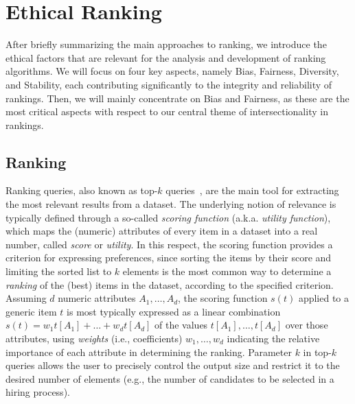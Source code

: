 \section{Ethical Ranking}
\label{ch:ethical_ranking}%

After briefly summarizing the main approaches to ranking, we introduce the ethical factors that are relevant for the analysis and development of ranking algorithms. We will focus on four key aspects, namely Bias, Fairness, Diversity, and Stability, each contributing significantly to the integrity and reliability of rankings.
%
Then, we will mainly concentrate on Bias and Fairness, as these are the most critical aspects with respect to our central theme of intersectionality in rankings. 

\subsection{Ranking}
\label{sec:ranking}

Ranking queries, also known as top-$k$ queries~\cite{DBLP:journals/csur/IlyasBS08}, are the main tool for extracting the most relevant results from a dataset. The underlying notion of relevance 
is typically defined through a so-called \emph{scoring function} (a.k.a. \emph{utility function}), which maps the (numeric) attributes of every item in a dataset into a real number, called \emph{score} or \emph{utility}.
In this respect, the scoring function provides a criterion for expressing preferences, since sorting the items by their score and limiting the sorted list to $k$ elements is the most common way to determine a \emph{ranking} of the (best) items in the dataset, according to the specified criterion.
Assuming $d$ numeric attributes $A_1,\ldots,A_d$, the scoring function $s(t)$ applied to a generic item $t$ is most typically expressed as a linear combination $s(t)=w_1 t[A_1] + \ldots + w_d t[A_d]$ of the values $t[A_1], \ldots, t[A_d]$ over those attributes, using \emph{weights} (i.e., coefficients) $w_1,\ldots,w_d$ indicating the relative importance of each attribute in determining the ranking.
%
Parameter $k$ in top-$k$ queries allows the user to precisely control the output size and restrict it to the desired number of elements (e.g., the number of candidates to be selected in a hiring process).

